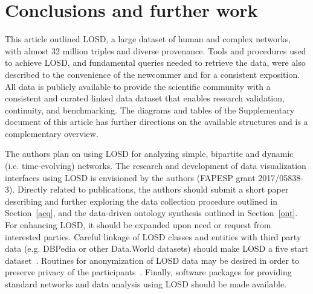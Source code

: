 \documentclass[data,datadescriptor,submit,moreauthors,pdftex]{Definitions/mdpi}
\begin{document}
\section{Conclusions and further work}
\label{conclusions}
This article outlined LOSD, a large dataset of human and complex networks, with almost 32 million triples and diverse provenance.
Tools and procedures used to achieve LOSD, and fundamental queries needed to retrieve the data, were also described to the convenience of the newcommer
and for a consistent exposition.
All data is publicly available to provide the scientific community with a consistent and curated linked data dataset
that enables research validation, continuity, and benchmarking.
The diagrams and tables of the Supplementary document of this article
has further directions on the available structures and is a complementary overview.

The authors plan on using LOSD for analyzing simple, bipartite
and dynamic (i.e. time-evolving) networks.
The research and development of data visualization interfaces using LOSD
is envisioned by the authors (FAPESP grant 2017/05838-3).
Directly related to publications, the authors should submit a short paper
describing and further exploring the data collection procedure outlined in Section~\ref{acq},
and the data-driven ontology synthesis outlined in Section~\ref{ont}.
For enhancing LOSD, it should be expanded upon need or request from interested parties.
Careful linkage of LOSD classes and entities with third party data (e.g. DBPedia or other Data.World datasets) should make LOSD a five start dataset~\cite{5star}.
Routines for anonymization of LOSD data may be desired in order to preserve privacy of the participants~\cite{ieee}.
Finally, software packages for providing standard networks and data analysis using LOSD should be made available.




\end{document}
